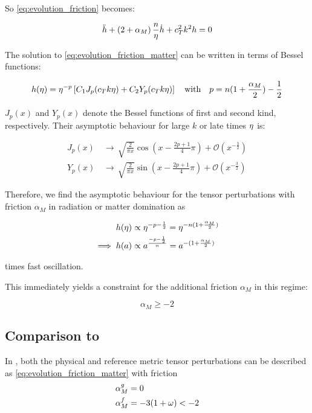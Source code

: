\documentclass[parskip=half]{scrreprt}
\begin{document}
So \ref{eq:evolution_friction} becomes:

\begin{equation}\label{eq:evolution_friction_matter}
	\ddot{h} + \left( 2 + \alpha_M \right) \frac{n}{\eta} \dot{h} + c_T^2 k^2 h = 0
\end{equation}

The solution to \ref{eq:evolution_friction_matter} can be written in terms of Bessel functions:

\begin{equation}
	h(\eta) = \eta^{-p} \left[C_1 J_p(c_T k \eta) + C_2 Y_p(c_T k \eta) \right] \quad \textrm{with} \quad p = n(1+\frac{\alpha_M}{2})-\frac{1}{2}
\end{equation}

$J_p(x)$ and $Y_p(x)$ denote the Bessel functions of first and second kind, respectively. Their asymptotic behaviour for large $k$ or late times $\eta$ is:

\begin{align}
	J_p(x) \, &\rightarrow \, \sqrt{\frac{2}{\pi x}} \cos(x-\frac{2p+1}{4}\pi) + \mathcal{O}(x^{-\frac{3}{2}}) \\
	Y_p(x) \, &\rightarrow \, \sqrt{\frac{2}{\pi x}} \sin(x-\frac{2p+1}{4}\pi) + \mathcal{O}(x^{-\frac{3}{2}})
\end{align}

Therefore, we find the asymptotic behaviour for the tensor perturbations with friction $\alpha_M$ in radiation or matter domination as

\begin{align}
	h(\eta) &\propto \eta^{-p-\frac{1}{2}} = \eta^{-n(1+\frac{\alpha_M}{2})} \\
	\implies h(a) &\propto a^{\frac{-p-\frac{1}{2}}{n}} = a^{-(1+\frac{\alpha_M}{2})}
\end{align}

times fast oscillation.

This immediately yields a constraint for the additional friction $\alpha_M$ in this regime:

\begin{equation}
	\alpha_M \geq -2
\end{equation}


\subsection{Comparison to \cite{Amendola2015}}

In \citep{Amendola2015}, both the physical and reference metric tensor perturbations can be described as \ref{eq:evolution_friction_matter} with friction
\begin{align}
	\alpha_M^{g} &= 0 \\
	\alpha_M^{f} &= -3(1+\omega) < -2
\end{align}
\end{document}
